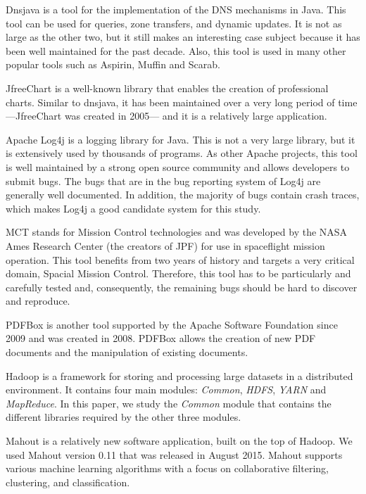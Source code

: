 \documentclass[times]{smrauth}
\begin{document}
Dnsjava \cite{Wellington2013} is a tool for the implementation of the DNS
mechanisms in Java. This tool can be used for queries, zone
transfers, and dynamic updates. It is not as large as the other
two, but it still makes an interesting case subject because it has
been well maintained for the past decade. Also, this tool is
used in many other popular tools such as Aspirin, Muffin and
Scarab.

JfreeChart \cite{ObjectRefineryLimited2005} is a well-known library that enables the
creation of professional charts. Similar to dnsjava, it has been
maintained over a very long period of time —JfreeChart was
created in 2005— and it is a relatively large application.

Apache Log4j \cite{TheApacheSoftwareFoundation1999} is a logging library for Java. This is not a
very large library, but it is extensively used by thousands of
programs. As other Apache projects, this tool is well
maintained by a strong open source community and allows
developers to submit bugs. The bugs that are in the bug
reporting system of Log4j are generally well
documented. In addition, the majority of bugs contain crash
traces, which makes Log4j a good candidate system for this study.

MCT \cite{NASA2009} stands for Mission Control technologies and was
developed by the NASA Ames Research Center (the creators
of JPF) for use in spaceflight mission operation. This tool
benefits from two years of history and targets a very critical
domain, Spacial Mission Control. Therefore, this tool has to
be particularly and carefully tested and, consequently, the
remaining bugs should be hard to discover and reproduce.

PDFBox \cite{ApacheSoftwareFoundation2014} is another tool supported by the Apache
Software Foundation since 2009 and was created in 2008.
PDFBox allows the creation of new PDF documents and the
manipulation of existing documents.

Hadoop \cite{hadoop2011hadoop} is a framework for storing and processing large datasets in a distributed environment. It contains four main modules: {\it Common}, {\it HDFS}, {\it YARN} and {\it MapReduce}. In this paper, we study the {\it Common} module that contains the different libraries required by the other three modules.

Mahout \cite{mahout2012scalable} is a relatively new software application, built on the top of Hadoop. We used Mahout version 0.11 that was released in August 2015. 
Mahout supports various machine learning algorithms with a focus on collaborative filtering, clustering, and classification.
\end{document}

